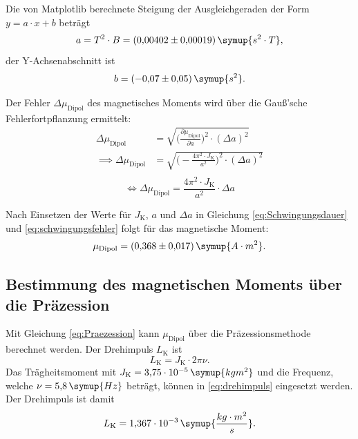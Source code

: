 Die von Matplotlib berechnete Steigung der Ausgleichgeraden der Form $y = a \cdot x + b$ beträgt 
\begin{equation*}
a = T^2\cdot B = (0{,}00402 \pm 0{,}00019)\, \symup{s^2\cdot T}, 
\end{equation*}
der Y-Achsenabschnitt ist 
\begin{equation*}
b = (-0{,}07 \pm 0{,}05)\, \symup{s^2}. 
\end{equation*}

Der Fehler $\Delta \mu_{\text{Dipol}}$ des magnetisches Moments wird über die Gauß'sche Fehlerfortpflanzung ermittelt:
\begin{equation*}
\begin{aligned}
\Delta{\mu_{\text{Dipol}}} &= \sqrt{\biggl(\frac{\partial \mu_{\text{Dipol}}}{\partial a}\biggr)^2 \cdot (\Delta a)^2} \\
\implies \Delta{\mu_{\text{Dipol}}} &= \sqrt{\biggl(- \frac{4\pi^2 \cdot J_{\text{K}}}{a^2}\biggr)^2 \cdot (\Delta a)^2} \\
\end{aligned}
\end{equation*}
\begin{equation}
\iff \Delta{\mu_{\text{Dipol}}} = \frac{4\pi^2 \cdot J_{\text{K}}}{a^2} \cdot \Delta a
\label{eq:schwingungsfehler}
\end{equation}

Nach Einsetzen der Werte für $J_{\text{K}}$, $a$ und $\Delta a$ in Gleichung \eqref{eq:Schwingungsdauer} und \eqref{eq:schwingungsfehler}
folgt für das magnetische Moment:
\begin{equation*}
\mu_{\text{Dipol}} = (0{,}368 \pm 0{,}017)\, \symup{A \cdot m^2}.
\end{equation*}



\newpage
\subsection{Bestimmung des magnetischen Moments über die Präzession}
Mit Gleichung \eqref{eq:Praezession} kann $\mu_{\text{Dipol}}$ über die Präzessionsmethode berechnet werden. Der Drehimpuls $L_{\text{K}}$ ist
\begin{equation}
L_{\text{K}} = J_{\text{K}} \cdot 2\pi \nu.
\label{eq:drehimpuls}
\end{equation}
Das Trägheitsmoment mit $J_{\text{K}} = 3{,}75 \cdot 10^{-5} \, \symup{kgm^2}$ und die Frequenz, welche $\nu = 5{,}8\, \symup{Hz}$ 
beträgt, können in \eqref{eq:drehimpuls} eingesetzt werden. Der Drehimpuls ist damit
\begin{equation*}
L_{\text{K}} = 1{,}367\cdot 10^{-3}\, \symup{\frac{kg\cdot m^2}{s}}.
\end{equation*}

